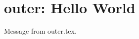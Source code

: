 \documentclass[main.tex]{subfiles}
\begin{document}
\chapter{outer: Hello World}
Message from outer.tex.
\end{document}
